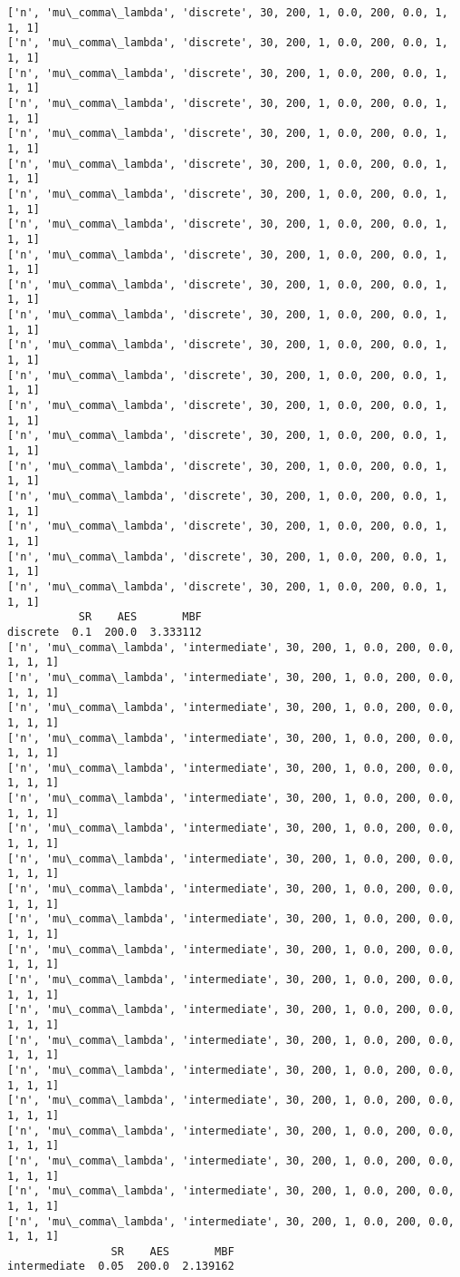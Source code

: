 \documentclass[11pt]{article}
\begin{document}
    \begin{Verbatim}[commandchars=\\\{\}]
['n', 'mu\_comma\_lambda', 'discrete', 30, 200, 1, 0.0, 200, 0.0, 1, 1, 1]
['n', 'mu\_comma\_lambda', 'discrete', 30, 200, 1, 0.0, 200, 0.0, 1, 1, 1]
['n', 'mu\_comma\_lambda', 'discrete', 30, 200, 1, 0.0, 200, 0.0, 1, 1, 1]
['n', 'mu\_comma\_lambda', 'discrete', 30, 200, 1, 0.0, 200, 0.0, 1, 1, 1]
['n', 'mu\_comma\_lambda', 'discrete', 30, 200, 1, 0.0, 200, 0.0, 1, 1, 1]
['n', 'mu\_comma\_lambda', 'discrete', 30, 200, 1, 0.0, 200, 0.0, 1, 1, 1]
['n', 'mu\_comma\_lambda', 'discrete', 30, 200, 1, 0.0, 200, 0.0, 1, 1, 1]
['n', 'mu\_comma\_lambda', 'discrete', 30, 200, 1, 0.0, 200, 0.0, 1, 1, 1]
['n', 'mu\_comma\_lambda', 'discrete', 30, 200, 1, 0.0, 200, 0.0, 1, 1, 1]
['n', 'mu\_comma\_lambda', 'discrete', 30, 200, 1, 0.0, 200, 0.0, 1, 1, 1]
['n', 'mu\_comma\_lambda', 'discrete', 30, 200, 1, 0.0, 200, 0.0, 1, 1, 1]
['n', 'mu\_comma\_lambda', 'discrete', 30, 200, 1, 0.0, 200, 0.0, 1, 1, 1]
['n', 'mu\_comma\_lambda', 'discrete', 30, 200, 1, 0.0, 200, 0.0, 1, 1, 1]
['n', 'mu\_comma\_lambda', 'discrete', 30, 200, 1, 0.0, 200, 0.0, 1, 1, 1]
['n', 'mu\_comma\_lambda', 'discrete', 30, 200, 1, 0.0, 200, 0.0, 1, 1, 1]
['n', 'mu\_comma\_lambda', 'discrete', 30, 200, 1, 0.0, 200, 0.0, 1, 1, 1]
['n', 'mu\_comma\_lambda', 'discrete', 30, 200, 1, 0.0, 200, 0.0, 1, 1, 1]
['n', 'mu\_comma\_lambda', 'discrete', 30, 200, 1, 0.0, 200, 0.0, 1, 1, 1]
['n', 'mu\_comma\_lambda', 'discrete', 30, 200, 1, 0.0, 200, 0.0, 1, 1, 1]
['n', 'mu\_comma\_lambda', 'discrete', 30, 200, 1, 0.0, 200, 0.0, 1, 1, 1]
           SR    AES       MBF
discrete  0.1  200.0  3.333112
['n', 'mu\_comma\_lambda', 'intermediate', 30, 200, 1, 0.0, 200, 0.0, 1, 1, 1]
['n', 'mu\_comma\_lambda', 'intermediate', 30, 200, 1, 0.0, 200, 0.0, 1, 1, 1]
['n', 'mu\_comma\_lambda', 'intermediate', 30, 200, 1, 0.0, 200, 0.0, 1, 1, 1]
['n', 'mu\_comma\_lambda', 'intermediate', 30, 200, 1, 0.0, 200, 0.0, 1, 1, 1]
['n', 'mu\_comma\_lambda', 'intermediate', 30, 200, 1, 0.0, 200, 0.0, 1, 1, 1]
['n', 'mu\_comma\_lambda', 'intermediate', 30, 200, 1, 0.0, 200, 0.0, 1, 1, 1]
['n', 'mu\_comma\_lambda', 'intermediate', 30, 200, 1, 0.0, 200, 0.0, 1, 1, 1]
['n', 'mu\_comma\_lambda', 'intermediate', 30, 200, 1, 0.0, 200, 0.0, 1, 1, 1]
['n', 'mu\_comma\_lambda', 'intermediate', 30, 200, 1, 0.0, 200, 0.0, 1, 1, 1]
['n', 'mu\_comma\_lambda', 'intermediate', 30, 200, 1, 0.0, 200, 0.0, 1, 1, 1]
['n', 'mu\_comma\_lambda', 'intermediate', 30, 200, 1, 0.0, 200, 0.0, 1, 1, 1]
['n', 'mu\_comma\_lambda', 'intermediate', 30, 200, 1, 0.0, 200, 0.0, 1, 1, 1]
['n', 'mu\_comma\_lambda', 'intermediate', 30, 200, 1, 0.0, 200, 0.0, 1, 1, 1]
['n', 'mu\_comma\_lambda', 'intermediate', 30, 200, 1, 0.0, 200, 0.0, 1, 1, 1]
['n', 'mu\_comma\_lambda', 'intermediate', 30, 200, 1, 0.0, 200, 0.0, 1, 1, 1]
['n', 'mu\_comma\_lambda', 'intermediate', 30, 200, 1, 0.0, 200, 0.0, 1, 1, 1]
['n', 'mu\_comma\_lambda', 'intermediate', 30, 200, 1, 0.0, 200, 0.0, 1, 1, 1]
['n', 'mu\_comma\_lambda', 'intermediate', 30, 200, 1, 0.0, 200, 0.0, 1, 1, 1]
['n', 'mu\_comma\_lambda', 'intermediate', 30, 200, 1, 0.0, 200, 0.0, 1, 1, 1]
['n', 'mu\_comma\_lambda', 'intermediate', 30, 200, 1, 0.0, 200, 0.0, 1, 1, 1]
                SR    AES       MBF
intermediate  0.05  200.0  2.139162


\end{Verbatim}
\end{document}
